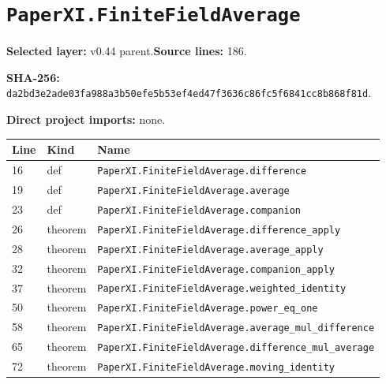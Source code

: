 \documentclass[10pt,oneside]{book}
\begin{document}
\section{\texorpdfstring{\nolinkurl{PaperXI.FiniteFieldAverage}}{PaperXI.FiniteFieldAverage}}\label{module:PaperXI.FiniteFieldAverage}

\textbf{Selected layer:} v0.44 parent.\quad\textbf{Source lines:} 186.\par\textbf{SHA-256:} {\scriptsize\nolinkurl{da2bd3e2ade03fa988a3b50efe5b53ef4ed47f3636c86fc5f6841cc8b868f81d}}.


\textbf{Direct project imports:} none.

\begin{longtable}{@{}p{}p{}p{}@{}}\toprule Line&Kind&Name\\\midrule\endhead

16&def&\nolinkurl{PaperXI.FiniteFieldAverage.difference}\\

19&def&\nolinkurl{PaperXI.FiniteFieldAverage.average}\\

23&def&\nolinkurl{PaperXI.FiniteFieldAverage.companion}\\

26&theorem&\nolinkurl{PaperXI.FiniteFieldAverage.difference_apply}\\

28&theorem&\nolinkurl{PaperXI.FiniteFieldAverage.average_apply}\\

32&theorem&\nolinkurl{PaperXI.FiniteFieldAverage.companion_apply}\\

37&theorem&\nolinkurl{PaperXI.FiniteFieldAverage.weighted_identity}\\

50&theorem&\nolinkurl{PaperXI.FiniteFieldAverage.power_eq_one}\\

58&theorem&\nolinkurl{PaperXI.FiniteFieldAverage.average_mul_difference}\\

65&theorem&\nolinkurl{PaperXI.FiniteFieldAverage.difference_mul_average}\\

72&theorem&\nolinkurl{PaperXI.FiniteFieldAverage.moving_identity}\\


\end{longtable}
\end{document}
